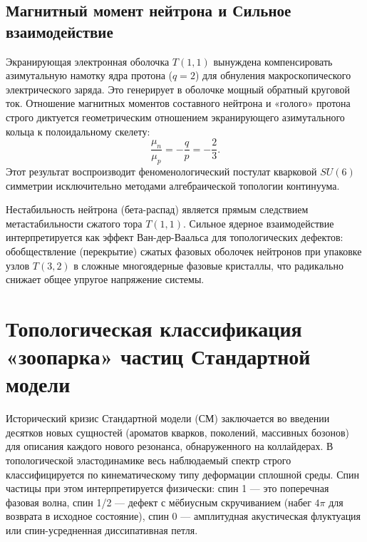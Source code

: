 \documentclass[11pt,a4paper]{article}
\begin{document}
\subsection{Магнитный момент нейтрона и Сильное взаимодействие}
Экранирующая электронная оболочка $T(1,1)$ вынуждена компенсировать азимутальную намотку ядра протона ($q=2$) для обнуления макроскопического электрического заряда. Это генерирует в оболочке мощный обратный круговой ток. Отношение магнитных моментов составного нейтрона и «голого» протона строго диктуется геометрическим отношением экранирующего азимутального кольца к полоидальному скелету:
\begin{equation}
\frac{\mu_n}{\mu_p} = -\frac{q}{p} = -\frac{2}{3}.
\end{equation}
Этот результат воспроизводит феноменологический постулат кварковой $SU(6)$ симметрии исключительно методами алгебраической топологии континуума.

Нестабильность нейтрона (бета-распад) является прямым следствием метастабильности сжатого тора $T(1,1)$. Сильное ядерное взаимодействие интерпретируется как эффект Ван-дер-Ваальса для топологических дефектов: обобществление (перекрытие) сжатых фазовых оболочек нейтронов при упаковке узлов $T(3,2)$ в сложные многоядерные фазовые кристаллы, что радикально снижает общее упругое напряжение системы.

\section{Топологическая классификация «зоопарка» частиц Стандартной модели}

Исторический кризис Стандартной модели (СМ) заключается во введении десятков новых сущностей (ароматов кварков, поколений, массивных бозонов) для описания каждого нового резонанса, обнаруженного на коллайдерах. В топологической эластодинамике весь наблюдаемый спектр строго классифицируется по кинематическому типу деформации сплошной среды. Спин частицы при этом интерпретируется физически: спин 1 — это поперечная фазовая волна, спин 1/2 — дефект с мёбиусным скручиванием (набег $4\pi$ для возврата в исходное состояние), спин 0 — амплитудная акустическая флуктуация или спин-усредненная диссипативная петля.
\end{document}
